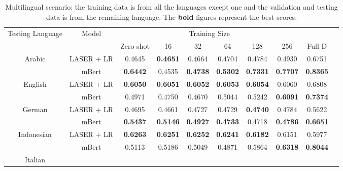 \documentclass[runningheads]{llncs}
\begin{document}
\begin{table}[!htb]
\scriptsize
\centering
\caption{Multilingual scenario: the training data is from all the languages except one and the validation and testing data is from the remaining language. The \textbf{bold} figures represent the best scores.}
\label{tab:allbutone}
\begin{tabular}{cccccccccc}
\toprule
\multirow{2}{*}{Testing Language}   & \multirow{2}{*}{Model} & \multicolumn{6}{c}{Training Size}         \\ 
                            &                        & Zero shot& 16 & 32 & 64 & 128 & 256 & Full D \\ \midrule
\multirow{2}{*}{Arabic}     
                            & LASER + LR             &0.4645    &\textbf{0.4651}    &0.4664    &0.4704     &0.4784     &0.4930   &0.6751       \\
                            & mBert                  &\textbf{0.6442}    &0.4535     &\textbf{0.4738}     &\textbf{0.5302}   &\textbf{0.7331}     &\textbf{0.7707}   &\textbf{0.8365}        \\ \midrule
\multirow{2}{*}{English}    
                            & LASER + LR             &\textbf{0.6050}    &\textbf{0.6051}    & \textbf{0.6052}     &\textbf{0.6053}     &\textbf{0.6054}     &0.6060    &0.6808       \\
                            & mBert                  &0.4971    &0.4750     &0.4670     &0.5044     &0.5242     &\textbf{0.6091}     &\textbf{0.7374}               \\ \midrule
\multirow{2}{*}{German}     
                            & LASER + LR             &0.4695    &0.4661    &0.4727    &0.4729     &\textbf{0.4740}     &0.4784   &0.5622        \\
                            & mBert                  &\textbf{0.5437}    &\textbf{0.5146}    &\textbf{0.4927}     &\textbf{0.4733}     &0.4718    & \textbf{0.4786}  &\textbf{0.6651}             \\ \midrule
\multirow{2}{*}{Indonesian}             
                            & LASER + LR             &\textbf{0.6263}    &\textbf{0.6251}    &\textbf{0.6252}      &\textbf{0.6241}     &\textbf{0.6182}     &0.6151     &0.5977        \\
                            & mBert                  &0.5113    &0.5186    &0.5049      &0.4871     &0.5864     &\textbf{0.6318}     &\textbf{0.8044}            \\ \midrule
\multirow{2}{*}{Italian}                 

\end{tabular}
\end{table}
\end{document}

